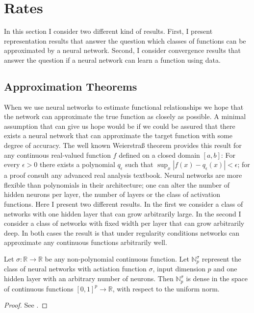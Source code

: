 \section{Rates}
\label{seq:rates}

In this section I consider two different kind of results. First, I present
representation results that answer the question which classes of functions can be
approximated by a neural network. Second, I consider convergence results that answer
the question if a neural network can learn a function using data.

\subsection{Approximation Theorems}

When we use neural networks to estimate functional relationships we hope that the
network can approximate the true function as closely as possible. A minimal assumption
that can give us hope would be if we could be assured that there exists a neural
network that can approximate the target function with some degree of accuracy. The
well known Weierstra{\ss} theorem provides this result for any continuous real-valued
function $f$ defined on a closed domain $[a, b]$: For every $\epsilon > 0$ there exists
a polynomial $q_\epsilon$ such that $\sup_{x} |f(x) - q_\epsilon(x)| < \epsilon$; for
a proof consult any advanced real analysis textbook. Neural networks are more flexible
than polynomials in their architecture; one can alter the number of hidden neurons per
layer, the number of layers or the class of activation functions. Here I present two
different results. In the first we consider a class of networks with one hidden layer
that can grow arbitrarily large. In the second I consider a class of networks with fixed
width per layer that can grow arbitrarily deep. In both cases the result is that under
regularity conditions networks can approximate any continuous functions arbitrarily
well.

\begin{theorem}
   Let $\sigma : \mathbb{R} \to \mathbb{R}$ be any non-polynomial continuous function.
   Let $\mathbb{N}_p^\sigma$ represent the class of neural networks with actiation
   function $\sigma$, input dimension $p$ and one hidden layer with an arbitrary number
   of neurons. Then $\mathbb{N}_p^\sigma$ is dense in the space of continuous functions
   $[0, 1]^p \to \mathbb{R}$, with respect to the uniform norm.
\end{theorem}
\begin{proof}
    See \cite{Cybenko.1989,Hornik.1991,Pinkus.1999}.
\end{proof}

